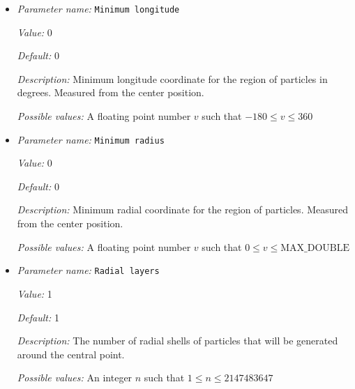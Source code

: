 \begin{itemize}
{\it Default:} 0


{\it Description:} Minimum latitude coordinate for the region of particles in degrees. Measured from the center position, and from the north pole.


{\it Possible values:} A floating point number $v$ such that $0 \leq v \leq 180$
\item {\it Parameter name:} {\tt Minimum longitude}
\label{parameters:Postprocess/Particles/Generator/Uniform radial/Minimum longitude}
\label{parameters:Postprocess/Particles/Generator/Uniform_20radial/Minimum_20longitude}


{\it Value:} 0


{\it Default:} 0


{\it Description:} Minimum longitude coordinate for the region of particles in degrees. Measured from the center position.


{\it Possible values:} A floating point number $v$ such that $-180 \leq v \leq 360$
\item {\it Parameter name:} {\tt Minimum radius}
\label{parameters:Postprocess/Particles/Generator/Uniform radial/Minimum radius}
\label{parameters:Postprocess/Particles/Generator/Uniform_20radial/Minimum_20radius}


{\it Value:} 0


{\it Default:} 0


{\it Description:} Minimum radial coordinate for the region of particles. Measured from the center position.


{\it Possible values:} A floating point number $v$ such that $0 \leq v \leq \text{MAX\_DOUBLE}$
\item {\it Parameter name:} {\tt Radial layers}
\label{parameters:Postprocess/Particles/Generator/Uniform radial/Radial layers}
\label{parameters:Postprocess/Particles/Generator/Uniform_20radial/Radial_20layers}


{\it Value:} 1


{\it Default:} 1


{\it Description:} The number of radial shells of particles that will be generated around the central point.


{\it Possible values:} An integer $n$ such that $1\leq n \leq 2147483647$
\end{itemize}

